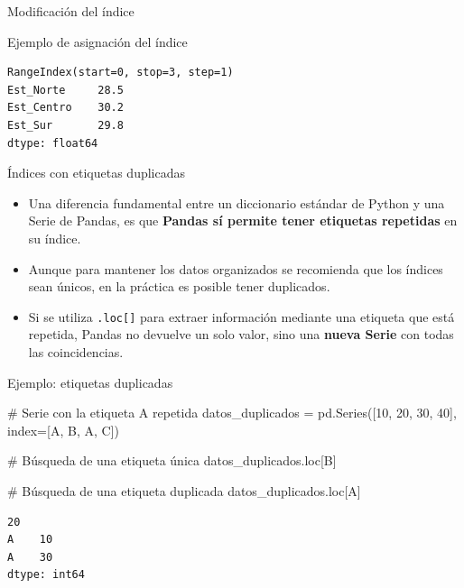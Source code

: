\documentclass[
  ignorenonframetext,
  aspectratio=169,
  spanish,
]{beamer}
\newenvironment{Shaded}{\begin{snugshade}}{\end{snugshade}}
\newcommand{\CommentTok}[1]{\textcolor[rgb]{0.37,0.37,0.37}{#1}}
\newcommand{\DecValTok}[1]{\textcolor[rgb]{0.68,0.00,0.00}{#1}}
\newcommand{\NormalTok}[1]{\textcolor[rgb]{0.00,0.23,0.31}{#1}}
\newcommand{\OperatorTok}[1]{\textcolor[rgb]{0.37,0.37,0.37}{#1}}
\newcommand{\StringTok}[1]{\textcolor[rgb]{0.13,0.47,0.30}{#1}}
\providecommand{\tightlist}{%
  \setlength{\itemsep}{0pt}\setlength{\parskip}{0pt}}
\newcommand*\circled[1]{\tikz[baseline=(char.base)]{
          \node[shape=circle,draw,inner sep=1pt] (char) {{\scriptsize#1}};}}
\begin{document}
\begin{frame}[fragile]{Modificación del índice}
\begin{block}{Ejemplo de asignación del índice}
\begin{verbatim}
RangeIndex(start=0, stop=3, step=1)
Est_Norte     28.5
Est_Centro    30.2
Est_Sur       29.8
dtype: float64
\end{verbatim}
\end{block}

\begin{block}{Índices con etiquetas duplicadas}
\label{uxedndices-con-etiquetas-duplicadas}

\begin{itemize}
\tightlist
\item
  Una diferencia fundamental entre un diccionario estándar de Python y
  una Serie de Pandas, es que \textbf{Pandas sí permite tener etiquetas
  repetidas} en su índice.
\item
  Aunque para mantener los datos organizados se recomienda que los
  índices sean únicos, en la práctica es posible tener duplicados.
\item
  Si se utiliza \texttt{.loc{[}{]}} para extraer información mediante
  una etiqueta que está repetida, Pandas no devuelve un solo valor, sino
  una \textbf{nueva Serie} con todas las coincidencias.
\end{itemize}
\end{block}

\begin{block}{Ejemplo: etiquetas duplicadas}
\label{ejemplo-etiquetas-duplicadas}
\label{annotated-cell-15}%
\begin{Shaded}
\begin{Highlighting}[]
\CommentTok{\# Serie con la etiqueta \textquotesingle{}A\textquotesingle{} repetida}
\NormalTok{datos\_duplicados }\OperatorTok{=}\NormalTok{ pd.Series([}\DecValTok{10}\NormalTok{, }\DecValTok{20}\NormalTok{, }\DecValTok{30}\NormalTok{, }\DecValTok{40}\NormalTok{], index}\OperatorTok{=}\NormalTok{[}\StringTok{\textquotesingle{}A\textquotesingle{}}\NormalTok{, }\StringTok{\textquotesingle{}B\textquotesingle{}}\NormalTok{, }\StringTok{\textquotesingle{}A\textquotesingle{}}\NormalTok{, }\StringTok{\textquotesingle{}C\textquotesingle{}}\NormalTok{])}

\CommentTok{\# Búsqueda de una etiqueta única}
\NormalTok{datos\_duplicados.loc[}\StringTok{\textquotesingle{}B\textquotesingle{}}\NormalTok{] }\hspace*{\fill}\NormalTok{\circled{1}}

\CommentTok{\# Búsqueda de una etiqueta duplicada}
\NormalTok{datos\_duplicados.loc[}\StringTok{\textquotesingle{}A\textquotesingle{}}\NormalTok{] }\hspace*{\fill}\NormalTok{\circled{2}}
\end{Highlighting}
\end{Shaded}

\begin{verbatim}
20
A    10
A    30
dtype: int64
\end{verbatim}
\end{block}
\end{frame}
\end{document}
